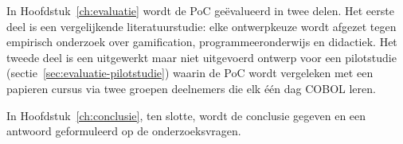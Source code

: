In Hoofdstuk~\ref{ch:evaluatie} wordt de PoC geëvalueerd in twee delen.
Het eerste deel is een vergelijkende literatuurstudie: elke ontwerpkeuze wordt afgezet tegen empirisch onderzoek over gamification, programmeeronderwijs en didactiek.
Het tweede deel is een uitgewerkt maar niet uitgevoerd ontwerp voor een pilotstudie (sectie~\ref{sec:evaluatie-pilotstudie}) waarin de PoC wordt vergeleken met een papieren cursus via twee groepen deelnemers die elk één dag COBOL leren.

In Hoofdstuk~\ref{ch:conclusie}, ten slotte, wordt de conclusie gegeven en een antwoord geformuleerd op de onderzoeksvragen.
